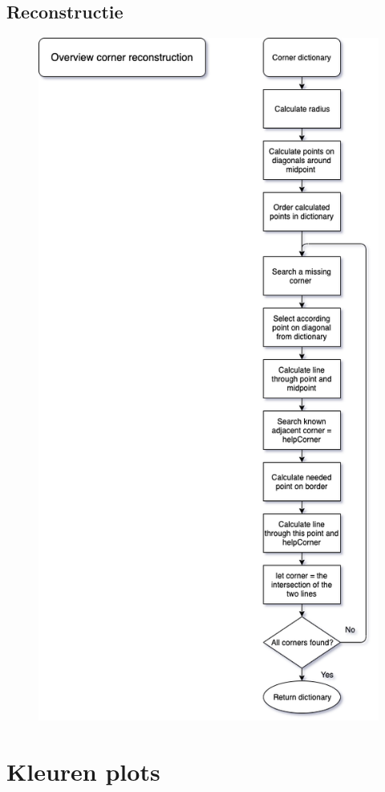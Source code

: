 \documentclass[a4paper,11pt]{article}
\begin{document}
\subsection{Reconstructie}
\begin{figure}[H]
	\centering
	\includegraphics[scale= 0.55]{img/ReconstructionFlowchart.png}
	\caption{}
	\label{bijlageA3}
\end{figure}
\newpage

\section{Kleuren plots}
\label{kleurenPlots}

\newpage
\end{document}
